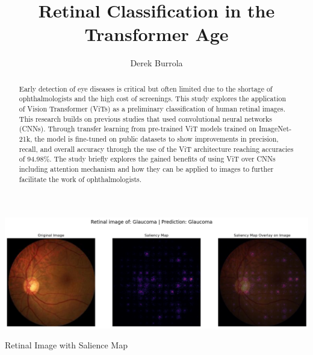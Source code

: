 \documentclass[sigconf]{acmart}
\begin{document}
\title{Retinal Classification in the Transformer Age}

\author{Derek Burrola}

\renewcommand{\shortauthors}{Burrola.}

\begin{abstract}
  Early detection of eye diseases is critical but often limited due to the shortage of ophthalmologists and the high cost of screenings. This study explores the application of Vision Transformer (ViTs) as a preliminary classification of human retinal images. This research builds on previous studies that used convolutional neural networks (CNNs). Through transfer learning from pre-trained ViT models trained on ImageNet-21k, the model is fine-tuned on public datasets to show improvements in precision, recall, and overall accuracy through the use of the ViT architecture reaching accuracies of 94.98\%. The study briefly explores the gained benefits of using ViT over CNNs including attention mechanism and how they can be applied to images to further facilitate the work of ophthalmologists.
\end{abstract}


\begin{teaserfigure}
  \includegraphics[width=\textwidth]{samples/resources/saliency maps/retinal_glaucoma.png}
  \caption{Retinal Image with Salience Map}
  \label{fig:teaser}
\end{teaserfigure}
\end{document}
